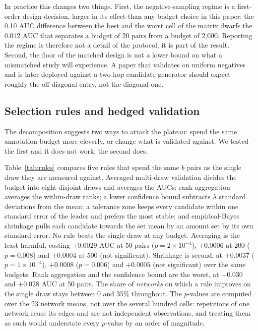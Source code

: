\documentclass{comjnl}
\begin{document}
In practice this changes two things. First, the negative-sampling regime is a first-order design decision, larger in its effect than any budget choice in this paper: the 0.10 AUC difference between the best and the worst cell of the matrix dwarfs the 0.012 AUC that separates a budget of 20 pairs from a budget of 2{,}000. Reporting the regime is therefore not a detail of the protocol; it is part of the result. Second, the floor of the matched design is not a lower bound on what a mismatched study will experience. A paper that validates on uniform negatives and is later deployed against a two-hop candidate generator should expect roughly the off-diagonal entry, not the diagonal one.

\subsection{Selection rules and hedged validation}
\label{sec:rules}

The decomposition suggests two ways to attack the plateau: spend the same annotation budget more cleverly, or change what is validated against. We tested the first and it does not work; the second does.

Table~\ref{tab:rules} compares five rules that spend the same $b$ pairs as the single draw they are measured against. Averaged multi-draw validation divides the budget into eight disjoint draws and averages the AUCs; rank aggregation averages the within-draw ranks; a lower confidence bound subtracts $\lambda$ standard deviations from the mean; a tolerance zone keeps every candidate within one standard error of the leader and prefers the most stable; and empirical-Bayes shrinkage pulls each candidate towards the set mean by an amount set by its own standard error. No rule beats the single draw at any budget. Averaging is the least harmful, costing $+0.0029$ AUC at 50 pairs ($p=2\times10^{-4}$), $+0.0006$ at 200 ($p=0.008$) and $+0.0004$ at 500 (not significant). Shrinkage is second, at $+0.0037$ ($p=1\times10^{-4}$), $+0.0008$ ($p=0.006$) and $+0.0005$ (not significant) over the same budgets. Rank aggregation and the confidence bound are the worst, at $+0.030$ and $+0.028$ AUC at 50 pairs. The share of \emph{networks} on which a rule improves on the single draw stays between 0 and 35\% throughout. The $p$-values are computed over the 23 network means, not over the several hundred cells: repetitions of one network reuse its edges and are not independent observations, and treating them as such would understate every $p$-value by an order of magnitude.
\end{document}
